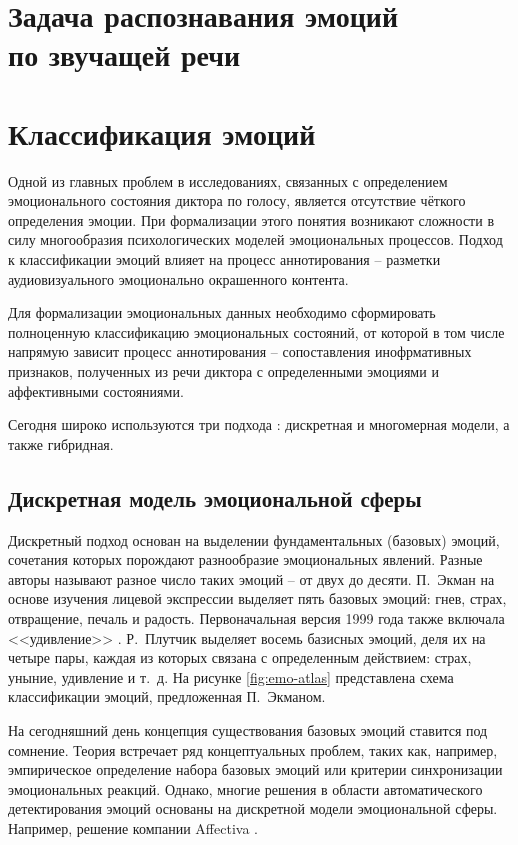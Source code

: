 \chapter[Задача распознавания эмоций по звучащей речи]{Задача распознавания эмоций\\по звучащей речи}

\chapter{Классификация эмоций}
Одной из главных проблем в исследованиях, связанных с определением эмоционального состояния диктора по голосу, является отсутствие чёткого определения эмоции. При формализации этого понятия возникают сложности в силу многообразия психологических моделей эмоциональных процессов. Подход к классификации эмоций влияет на процесс аннотирования -- разметки аудиовизуального эмоционально окрашенного контента. 

Для формализации эмоциональных данных необходимо сформировать полноценную классификацию эмоциональных состояний, от которой в том числе напрямую зависит процесс аннотирования -- сопоставления инофрмативных признаков, полученных из речи диктора с определенными эмоциями и аффективными состояниями.

Сегодня широко используются три подхода : дискретная и многомерная модели, а также гибридная.

\section{Дискретная модель эмоциональной сферы}
Дискретный подход основан на выделении фундаментальных (базовых) эмоций, сочетания которых порождают разнообразие эмоциональных явлений. Разные авторы называют разное число таких эмоций -- от двух до десяти. П.~Экман на основе изучения лицевой экспрессии выделяет пять базовых эмоций: гнев, страх, отвращение, печаль и радость. Первоначальная версия 1999 года также включала <<удивление>> \cite{Ekman1972, Ekman1992}. Р.~Плутчик \cite{Plutchik1980} выделяет восемь базисных эмоций, деля их на четыре пары, каждая из которых связана с определенным действием: страх, уныние, удивление и т.~д. На рисунке \ref{fig:emo-atlas} представлена схема классификации эмоций, предложенная П.~Экманом. 

На сегодняшний день концепция существования базовых эмоций ставится под сомнение. Теория встречает ряд концептуальных проблем, таких как, например, эмпирическое определение набора базовых эмоций или критерии синхронизации эмоциональных реакций. Однако, многие решения в области автоматического детектирования эмоций основаны на дискретной модели эмоциональной сферы. Например, решение компании Affectiva \cite{Affectica}.

